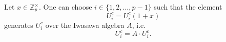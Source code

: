 Let $x \in \mathbb{Z}_p^\times$. One can choose $i \in \{1, 2, \dots, p-1\}$ such that the element
$$U_i^c = U_i^c(1 + x)$$
generates $U_i^c$ over the Iwasawa algebra $A$, i.e.
$$U_i^c = A \cdot U_i^c.$$
